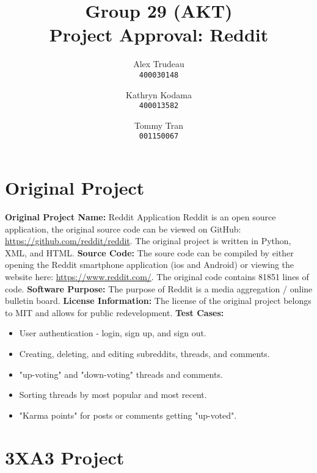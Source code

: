 \documentclass[12pt,fleqn]{article}
\title{Group 29 (AKT)\\ Project Approval: Reddit}
\author{
Alex Trudeau\\
	\texttt{400030148}
\and
Kathryn Kodama\\
  	\texttt{400013582}
\and
Tommy Tran\\
	\texttt{001150067}
}
\begin{document}
\maketitle
\pagebreak
\section *{Original Project}
\textbf{Original Project Name:} Reddit Application
\newline  \newline
Reddit is an open source application, the original source code can be viewed on GitHub: \url{https://github.com/reddit/reddit}.  The original project is written in Python, XML, and HTML.
\newline \newline
\textbf{Source Code: }The soure code can be compiled by either opening the Reddit smartphone application (ios and Android) or viewing the website here: \url{https://www.reddit.com/}.  The original code contains 81851 lines of code. 
\newline  \newline
\textbf{Software Purpose: } The purpose of Reddit is a media aggregation / online bulletin board.
\newline  \newline
\textbf{License Information: }  The license of the original project belongs to MIT and allows for public redevelopment.
\newline  \newline
\textbf{Test Cases: }

\begin{itemize}
\item User authentication - login, sign up, and sign out.
\item Creating, deleting, and editing subreddits, threads, and comments.
\item "up-voting" and "down-voting" threads and comments.
\item Sorting threads by most popular and most recent.
\item "Karma points" for posts or comments getting "up-voted".
\end{itemize}

\section *{3XA3 Project}
\end{document}
